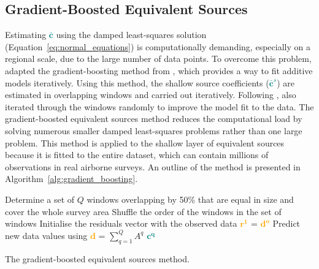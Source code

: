 \subsection{Gradient-Boosted Equivalent Sources}
\label{sec:gradient-boosting}

Estimating \textcolor{teal}{$\bar{\mathbf{c}}$} using the damped least-squares solution (Equation~\ref{eq:normal_equations}) is computationally demanding, especially on a regional scale, due to the large number of data points.
To overcome this problem, \citet{Soler2021} adapted the gradient-boosting method from \citet{Friedman2001}, which provides a way to fit additive models iteratively. Using this method, the shallow source coefficients (\textcolor{teal}{$\bar{\mathbf{c}}^s$}) are estimated in overlapping windows and carried out iteratively. Following \citet{Friedman2002}, \citet{Soler2021} also iterated through the windows randomly to improve the model fit to the data. The gradient-boosted equivalent sources method reduces the computational load by solving numerous smaller damped least-squares problems rather than one large problem. This method is applied to the shallow layer of equivalent sources because it is fitted to the entire dataset, which can contain millions of observations in real airborne surveys. An outline of the method is presented in Algorithm~\ref{alg:gradient_boosting}.

\begin{algorithm}[!h]
    Determine a set of $Q$ windows overlapping by 50\% that are equal in size and cover the whole survey area
    \;
    Shuffle the order of the windows in the set of windows
    \;
    Initialise the residuals vector with the observed data \textcolor{orange}{$\mathbf{r^1}$} = \textcolor{orange}{$\mathbf{d^o}$}
    \;
    Predict new data values using \textcolor{orange}{$\mathbf{d}$} = $\sum\limits_{q=1}^{Q} A^q$ \textcolor{teal}{$\mathbf{c^q}$}
    \;
    \BlankLine
    \caption{The gradient-boosted equivalent sources method.}
    \label{alg:gradient_boosting}
\end{algorithm}

